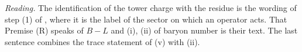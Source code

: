 \emph{Reading.} The identification of the tower charge with the residue is the wording of step (1) of , where it is the label of the sector on which an operator acts. That Premise (R) speaks of $B - L$ and (i), (ii) of baryon number is their text. The last sentence combines the trace statement of (v) with (ii).
